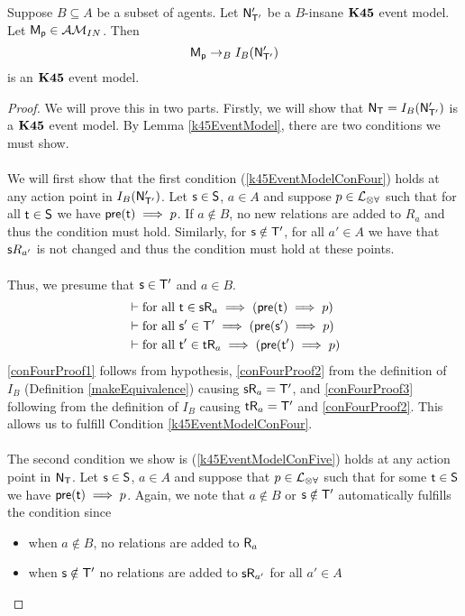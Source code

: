 \begin{lemma}
	Suppose $B \subseteq A$ be a subset of agents.
	Let $\mathrm{\mathsf{N}}'_{\mathrm{\mathsf{T}}'}$ be a $B$-insane $\bf K45$ event model.
	Let $\mathrm{\mathsf{M_p}} \in \mathcal{AM}_{IN}$.
	Then
	\[
		\mathrm{\mathsf{M_p}} \to_B I_B(\mathrm{\mathsf{N}}'_{\mathrm{\mathsf{T}}'})
	\]
	is an $\bf K45$ event model.
\end{lemma}
\begin{proof}
	We will prove this in two parts.
	Firstly, we will show that $\mathrm{\mathsf{N}}_\mathrm{\mathsf{T}} = I_B(\mathrm{\mathsf{N}}'_{\mathrm{\mathsf{T}}'})$ is a $\bf K45$ event model.
	By Lemma \ref{k45EventModel}, there are two conditions we must show.\\
	\\
	We will first show that the first condition (\ref{k45EventModelConFour}) holds at any action point
	in $I_B(\mathrm{\mathsf{N}}'_{\mathrm{\mathsf{T}}'})$.
	Let $\mathrm{\mathsf{s}} \in \mathrm{\mathsf{S}}$, $a \in A$ and suppose $p \in \mathcal{L}_{\otimes\forall}$ such that for all $\mathrm{\mathsf{t}} \in
	\mathrm{\mathsf{S}}$ we have $\mathrm{\mathsf{pre}}(\mathrm{\mathsf{t}}) \implies p$.
	If $a \notin B$, no new relations are added to $R_a$ and thus the condition must hold.
	Similarly, for $\mathrm{\mathsf{s}} \notin \mathrm{\mathsf{T}}'$, for all $a' \in A$ we have that $\mathrm{\mathsf{s}} R_{a'}$ is not changed and
	thus the condition must hold at these points.\\
	\\
	Thus, we presume that $\mathrm{\mathsf{s}} \in \mathrm{\mathsf{T}}'$ and $a \in B$.
	\begin{align}
		& \vdash \text{for all } \mathrm{\mathsf{t}} \in \mathrm{\mathsf{s}} \mathrm{\mathsf{R}}_a \implies (\mathrm{\mathsf{pre}}(\mathrm{\mathsf{t}}) \implies p)
		\label{conFourProof1} \\
		& \vdash \text{for all } \mathrm{\mathsf{s}}' \in \mathrm{\mathsf{T}}' \implies (\mathrm{\mathsf{pre}}(\mathrm{\mathsf{s}}') \implies p)
		\label{conFourProof2} \\
		& \vdash \text{for all } \mathrm{\mathsf{t}}' \in \mathrm{\mathsf{t}} \mathrm{\mathsf{R}}_a \implies (\mathrm{\mathsf{pre}}(\mathrm{\mathsf{t}}') \implies p)
		\label{conFourProof3}
	\end{align}
	\ref{conFourProof1} follows from hypothesis, \ref{conFourProof2} from the definition of $I_B$
	(Definition \ref{makeEquivalence}) causing $\mathrm{\mathsf{s}} \mathrm{\mathsf{R}}_a = \mathrm{\mathsf{T}}'$, and \ref{conFourProof3} following
	from the definition of $I_B$ causing $\mathrm{\mathsf{t}} \mathrm{\mathsf{R}}_a = \mathrm{\mathsf{T}}'$ and \ref{conFourProof2}.
	This allows us to fulfill Condition \ref{k45EventModelConFour}.\\
	\\
	The second condition we show is (\ref{k45EventModelConFive}) holds at any action point in
	$\mathrm{\mathsf{N}}_\mathrm{\mathsf{T}}$.
	Let $\mathrm{\mathsf{s}} \in \mathrm{\mathsf{S}}$, $a \in A$ and suppose that $p \in \mathcal{L}_{\otimes\forall}$ such that for some $\mathrm{\mathsf{t}} \in \mathrm{\mathsf{S}}$ 
	we have $\mathrm{\mathsf{pre}}(\mathrm{\mathsf{t}}) \implies p$.
	Again, we note that $a \notin B$ or $\mathrm{\mathsf{s}} \notin \mathrm{\mathsf{T}}'$ automatically fulfills the condition since
	\begin{itemize}
		\item when $a \notin B$, no relations are added to $\mathrm{\mathsf{R}}_a$
		\item when $\mathrm{\mathsf{s}} \notin \mathrm{\mathsf{T}}'$ no relations are added to $\mathrm{\mathsf{s}} \mathrm{\mathsf{R}}_{a'}$ for all $a' \in A$
	\end{itemize}


\end{proof}

